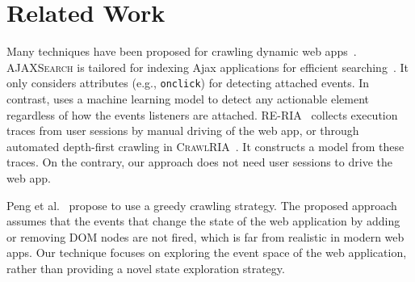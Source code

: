 
\section{Related Work}
\label{sec:related-work}

Many techniques have been proposed 
for crawling dynamic web apps~\cite{Mirtaheri:2013:HistoryOfCrawlers}.
\textsc{AJAXSearch} is tailored for indexing Ajax applications
for efficient searching~\cite{Frey:2007-IndexingAjaxApps, Duda:2008:AjaxSearchTool}.
It only considers \html attributes (e.g., \texttt{onclick}) 
for detecting attached events. 
In contrast, \toolName uses a machine learning model to detect any actionable element regardless of how the events listeners are attached.
\textsc{RE-RIA}~\cite{Amalfitano:2008:ReverseEngineeringRIA} 
collects execution traces from user sessions by manual driving of the web app,
or through automated depth-first crawling in \textsc{CrawlRIA}~\cite{Amalfitano:2010:CrawlRIA}.
It constructs a model from these traces. %
On the contrary, our approach does not need user sessions to drive the web app. %

Peng et al.~\cite{Peng:2012:GraphBased} propose to use a greedy crawling strategy.
The proposed approach assumes that 
the events that change the state of the web application by adding or removing DOM nodes are not fired,
which is far from realistic in modern web apps.
Our technique focuses on exploring the event space of the web application,
rather than providing a novel state exploration strategy.

